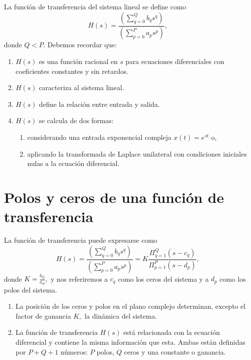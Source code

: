 \documentclass[11pt,a4paper,openany]{book}
\begin{document}
La funci\'{o}n de transferencia del sistema lineal se define como
\begin{equation}
	H\left( s\right) =
	\frac{\left( \sum_{q=0}^{Q}b_{q}s^{q}\right) }{\left(\sum_{p=0}^{P}a_{p}s^{p}\right) },
\end{equation}
donde $Q < P$. Debemos recordar que:
\begin{enumerate}
	\item $H(s)$ es una funci\'{o}n racional en $s$ para ecuaciones diferenciales con coeficientes constantes y sin retardos.
	\item $H(s)$ caracteriza al sistema lineal.
	\item $H(s)$ define la relaci\'{o}n entre entrada y salida.
	\item $H(s)$ se calcula de dos formas:
	\begin{enumerate}
		\item considerando una entrada exponencial compleja $x(t) = e^{s t}$ o,
		\item aplicando la transformada de Laplace unilateral con condiciones iniciales nulas a la ecuaci\'{o}n diferencial.
	\end{enumerate}
\end{enumerate}

\section{Polos y ceros de una funci\'{o}n de transferencia}

La funci\'{o}n de transferencia puede expresarse como 
\begin{equation}
	H\left( s\right) =
	\frac{\left( \sum_{q=0}^{Q}b_{q}s^{q}\right) }{\left(\sum_{p=0}^{P}a_{p}s^{p}\right) }=
	K\frac{\Pi _{q=1}^{Q}\left(s-c_{q}\right) }{\Pi _{p=1}^{P}\left( s-d_{p}\right) },
\end{equation}
donde $K=\frac{b_{Q}}{a_{P}},$ y nos referiremos a $c_{q}$ como los ceros del sistema y a $d_{p}$ como los polos del sistema.

\begin{enumerate}
	\item La posici\'{o}n de los ceros y polos en el plano complejo determinan, excepto el factor de ganancia $K,$ la din\'{a}mica del sistema.
	\item La funci\'{o}n de transferencia $H\left( s\right) $ est\'{a} relacionada con la ecuaci\'{o}n diferencial y contiene la misma informaci\'{o}n que esta. Ambas est\'{a}n definidas por $P+Q+1$ n\'{u}meros: $P$ polos, $Q$ ceros y una constante o ganancia.
\end{enumerate}
\end{document}
